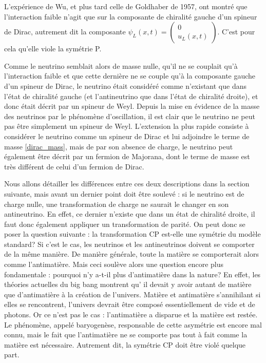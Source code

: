 			L'expérience de Wu, et plus tard celle de Goldhaber\cite{Goldhaber1958} de 1957, ont montré que l'interaction faible n'agit que sur la composante de chiralité gauche d'un spineur de Dirac, autrement dit la composante $\psi_L(x,t)=\left(\begin{matrix}0 \\ u_L(x,t)\end{matrix}\right)$. C'est pour cela qu'elle viole la symétrie P.
			
			Comme le neutrino semblait alors de masse nulle, qu'il ne se couplait qu'à l'interaction faible et que cette dernière ne se couple qu'à la composante gauche d'un spineur de Dirac, le neutrino était considéré comme n'existant que dans l'état de chiralité gauche (et l'antineutrino que dans l'état de chiralité droite), et donc était décrit par un spineur de Weyl. Depuis la mise en évidence de la masse des neutrinos par le phénomène d'oscillation, il est clair que le neutrino ne peut pas être simplement un spineur de Weyl. L'extension la plus rapide consiste à considérer le neutrino comme un spineur de Dirac et lui adjoindre le terme de masse \eqref{dirac_mass}, mais de par son absence de charge, le neutrino peut également être décrit par un fermion de Majorana, dont le terme de masse est très différent de celui d'un fermion de Dirac. 
			
			Nous allons détailler les différences entre ces deux descriptions dans la section suivante, mais avant un dernier point doit être soulevé : si le neutrino est de charge nulle, une transformation de charge ne saurait le changer en son antineutrino. En effet, ce dernier n'existe que dans un état de chiralité droite, il faut donc également appliquer un transformation de parité. On peut donc se poser la question suivante : la transformation CP est-elle une symétrie du modèle standard? Si c'est le cas, les neutrinos et les antineutrinos doivent se comporter de la même manière. De manière générale, toute la matière se comporterait alors comme l'antimatière. Mais ceci soulève alors une question encore plus fondamentale : pourquoi n'y a-t-il plus d'antimatière dans la nature? En effet, les théories actuelles du big bang\cite{Canetti2012} montrent qu' il devait y avoir autant de matière que d'antimatière à la création de l'univers. Matière et antimatière s'annihilant si elles se rencontrent, l'univers devrait être composé essentiellement de vide et de photons. Or ce n'est pas le cas : l'antimatière a disparue et la matière est restée. Le phénomène, appelé baryogenèse, responsable de cette asymétrie est encore mal connu, mais le fait que l'antimatière ne se comporte pas tout à fait comme la matière est nécessaire\cite{Sakharov1991}. Autrement dit, la symétrie CP doit être violé quelque part.
			
